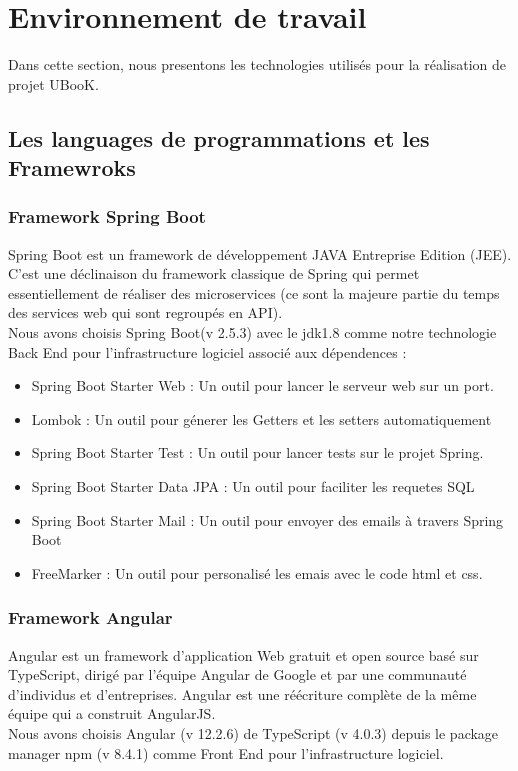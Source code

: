 \documentclass[12pt]{report}
\begin{document}
\section{Environnement de travail}

Dans cette section, nous presentons les technologies utilisés pour la réalisation de projet UBooK.

\subsection{Les languages de programmations et les Framewroks}

\subsubsection{Framework Spring Boot}

Spring Boot est un framework de développement JAVA Entreprise Edition (JEE). C'est une déclinaison du framework classique de Spring qui permet essentiellement de réaliser des microservices (ce sont la majeure partie du temps des services web qui sont regroupés en API)\cite{24}.\\
Nous avons choisis Spring Boot(v 2.5.3) avec le jdk1.8 comme notre technologie Back End pour l'infrastructure logiciel associé aux dépendences :
\begin{itemize}
\item Spring Boot Starter Web : Un outil pour lancer le serveur web sur un port.
\item Lombok : Un outil pour génerer les Getters et les setters automatiquement
\item Spring Boot Starter Test : Un outil pour lancer tests sur le projet Spring.
\item Spring Boot Starter Data JPA : Un outil pour faciliter les requetes SQL 
\item Spring Boot Starter Mail : Un outil pour envoyer des emails à travers Spring Boot
\item FreeMarker : Un outil pour personalisé les emais avec le code html et css.
\end{itemize}

\subsubsection{Framework Angular}
Angular est un framework d'application Web gratuit et open source basé sur TypeScript, dirigé par l'équipe Angular de Google et par une communauté d'individus et d'entreprises. Angular est une réécriture complète de la même équipe qui a construit AngularJS.\cite{25}\\
Nous avons choisis Angular (v 12.2.6) de TypeScript (v 4.0.3) depuis le package manager npm (v 8.4.1) comme Front End pour l'infrastructure logiciel.
\end{document}
